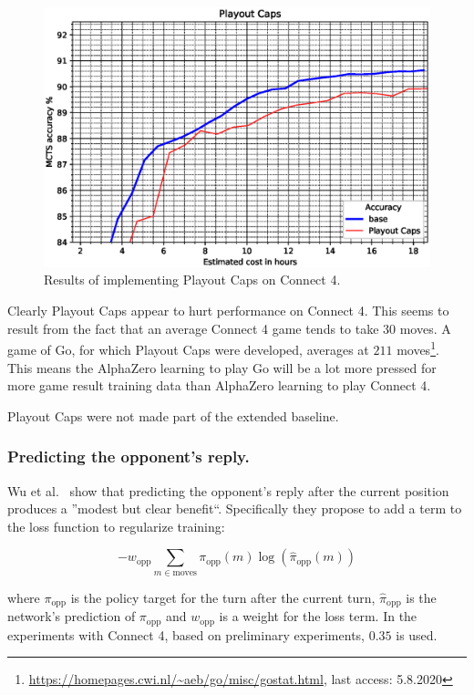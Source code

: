 \documentclass[12pt,onecolumn,oneside,titlepage]{article}
\begin{document}
\begin{figure}[H]
\centering
\includegraphics[clip,width=\columnwidth]{playout_caps}
\caption{Results of implementing Playout Caps on Connect 4.}
\label{fig:playout_caps}
\end{figure}

Clearly Playout Caps appear to hurt performance on Connect 4. This seems to result from the fact that an average Connect 4 game tends to take $30$ moves.
A game of Go, for which Playout Caps were developed, averages at $211$ moves\footnote{\url{https://homepages.cwi.nl/~aeb/go/misc/gostat.html}, last access: 5.8.2020}.
This means the AlphaZero learning to play Go will be a lot more pressed for more game result training data than AlphaZero learning to play Connect 4.

Playout Caps were not made part of the extended baseline.

\subsubsection{Predicting the opponent's reply.}

Wu et al.\ \cite{wu2019accelerating} show that predicting the opponent's reply after the current position produces a ''modest but clear benefit``.
Specifically they propose to add a term to the loss function to regularize training:

\begin{equation}
 -w_{\text{opp}} \sum\limits_{m \in \text{moves}} \pi_{\text{opp}}(m) \log(\hat{\pi}_{\text{opp}}(m)) \label{eq:opp_reply}
\end{equation}

where $\pi_{\text{opp}}$ is the policy target for the turn after the current turn, $\hat{\pi}_{\text{opp}}$ is the network's prediction of $\pi_{\text{opp}}$ and $w_{\text{opp}}$ is a weight for the loss term. In the experiments with Connect 4, based on preliminary experiments, $0.35$ is used.
\end{document}
